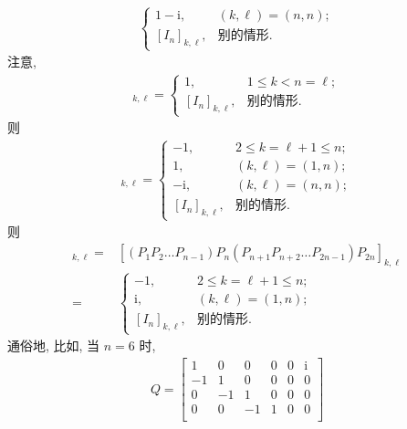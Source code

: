 \documentclass[../libro.tex]{subfiles}
\begin{document}
\begin{example}
\begin{align*}
\begin{cases}
            1 - \mathrm{i}, & (k, \ell) = (n, n);         \\
            [I_n]_{k,\ell}, & \text{别的情形}.
        \end{cases}
    \end{align*}
    注意,
    \begin{align*}
        [P_{n+1} P_{n+2} \dots P_{2n-1}]_{k,\ell} =
        \begin{cases}
            1,              & 1 \leq k < n = \ell; \\
            [I_n]_{k,\ell}, & \text{别的情形}.
        \end{cases}
    \end{align*}
    则
    \begin{align*}
        [(P_1 P_2 \dots P_{n-1}) P_n
        (P_{n+1} P_{n+2} \dots P_{2n-1})]_{k,\ell} =
        \begin{cases}
            -1,             & 2 \leq k = \ell + 1 \leq n; \\
            1,              & (k, \ell) = (1, n);         \\
            -\mathrm{i},    & (k, \ell) = (n, n);         \\
            [I_n]_{k,\ell}, & \text{别的情形}.
        \end{cases}
    \end{align*}
    则
    \begin{align*}
        [Q]_{k,\ell}
        = {} &
        [(P_1 P_2 \dots P_{n-1}) P_n
        (P_{n+1} P_{n+2} \dots P_{2n-1}) P_{2n}]_{k,\ell}
        \\
        = {} &
        \begin{cases}
            -1,             & 2 \leq k = \ell + 1 \leq n; \\
            \mathrm{i},     & (k, \ell) = (1, n);         \\
            [I_n]_{k,\ell}, & \text{别的情形}.
        \end{cases}
    \end{align*}
    通俗地, 比如, 当 \(n = 6\) 时,
    \begin{align*}
        Q =
        \begin{bmatrix}
            1  & 0  & 0  & 0  & 0  & \mathrm{i} \\
            -1 & 1  & 0  & 0  & 0  & 0          \\
            0  & -1 & 1  & 0  & 0  & 0          \\
            0  & 0  & -1 & 1  & 0  & 0          \\

\end{bmatrix}
\end{align*}
\end{example}
\end{document}
